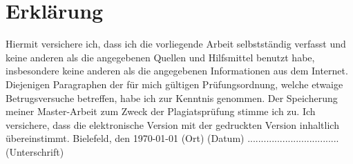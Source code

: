 \documentclass[
        ngerman,
        paper=a4,
        numbers=noendperiod,
]{scrreprt}
\begin{document}
\chapter*{Erklärung}
Hiermit versichere ich, dass ich die vorliegende Arbeit selbstständig verfasst und keine anderen als die angegebenen Quellen und Hilfsmittel benutzt habe, insbesondere keine anderen als die angegebenen Informationen aus dem Internet. Diejenigen Paragraphen der für mich gültigen Prüfungsordnung, welche etwaige Betrugsversuche betreffen, habe ich zur Kenntnis genommen. Der Speicherung meiner Master-Arbeit zum Zweck der Plagiatsprüfung stimme ich zu. Ich versichere, dass die elektronische Version mit der gedruckten Version inhaltlich übereinstimmt.\newline
\linebreak
\linebreak
\linebreak
Bielefeld, den \today\newline
(Ort) (Datum)\newline
\linebreak
\linebreak
\linebreak
..................................\newline
(Unterschrift)
\end{document}
